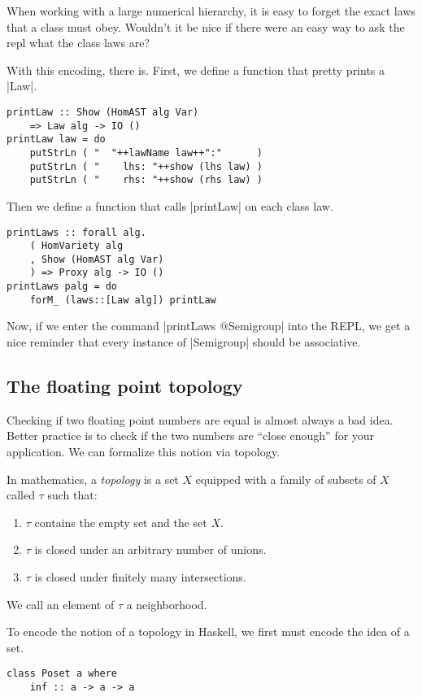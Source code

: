 \documentclass[preprint]{sigplanconf}
\theoremstyle{definition}
\begin{document}
When working with a large numerical hierarchy,
it is easy to forget the exact laws that a class must obey.
Wouldn't it be nice if there were an easy way to ask the repl what the class laws are?

With this encoding, there is.
First, we define a function that pretty prints a |Law|.
\begin{lstlisting}
printLaw :: Show (HomAST alg Var)
    => Law alg -> IO ()
printLaw law = do
    putStrLn ( "  "++lawName law++":"      )
    putStrLn ( "    lhs: "++show (lhs law) )
    putStrLn ( "    rhs: "++show (rhs law) )
\end{lstlisting}
Then we define a function that calls |printLaw| on each class law.
\begin{lstlisting}
printLaws :: forall alg.
    ( HomVariety alg
    , Show (HomAST alg Var)
    ) => Proxy alg -> IO ()
printLaws palg = do
    forM_ (laws::[Law alg]) printLaw
\end{lstlisting}
Now, if we enter the command |printLaws @Semigroup| into the REPL,
we get a nice reminder that every instance of |Semigroup| should be associative.

\subsection{The floating point topology}

Checking if two floating point numbers are equal is almost always a bad idea.
Better practice is to check if the two numbers are ``close enough'' for your application.
We can formalize this notion via topology.

In mathematics, a \emph{topology} is a set $X$ equipped with a family of subsets of $X$ called $\tau$ such that:
\begin{enumerate}
\item
$\tau$ contains the empty set and the set $X$.
\item
$\tau$ is closed under an arbitrary number of unions.
\item
$\tau$ is closed under finitely many intersections.
\end{enumerate}
We call an element of $\tau$ a neighborhood.

To encode the notion of a topology in Haskell,
we first must encode the idea of a set.

\begin{lstlisting}
class Poset a where
    inf :: a -> a -> a
\end{lstlisting}
\end{document}
